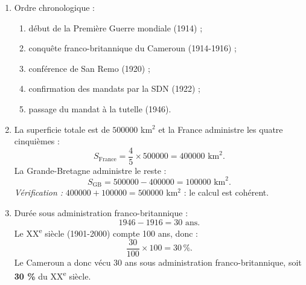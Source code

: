 \documentclass[11pt]{article}
\begin{document}
\begin{corrige}
\begin{enumerate}
\item Ordre chronologique :
\begin{enumerate}
\item début de la Première Guerre mondiale (1914) ;
\item conquête franco-britannique du Cameroun (1914-1916) ;
\item conférence de San Remo (1920) ;
\item confirmation des mandats par la SDN (1922) ;
\item passage du mandat à la tutelle (1946).
\end{enumerate}
\item La superficie totale est de $\num{500000}$ km$^2$ et la France administre les quatre cinquièmes :
\[ S_{\text{France}} = \frac{4}{5} \times \num{500000} = \num{400000} \text{ km}^2. \]
La Grande-Bretagne administre le reste :
\[ S_{\text{GB}} = \num{500000} - \num{400000} = \num{100000} \text{ km}^2. \]
\emph{Vérification :} $\num{400000} + \num{100000} = \num{500000}$ km$^2$ : le calcul est cohérent.
\item Durée sous administration franco-britannique :
\[ 1946 - 1916 = 30 \text{ ans}. \]
Le XX\textsuperscript{e} siècle (1901-2000) compte 100 ans, donc :
\[ \frac{30}{100} \times 100 = 30\,\%. \]
Le Cameroun a donc vécu 30 ans sous administration franco-britannique, soit \textbf{30 \%} du XX\textsuperscript{e} siècle.
\end{enumerate}
\end{corrige}
\end{document}
